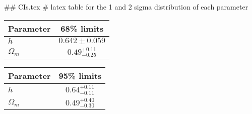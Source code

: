 ## CIs.tex
# latex table for the 1 and 2 sigma distribution of each parameter

\begin{tabular} { l  c}
 Parameter &  68\% limits\\
\hline
{\boldmath$h              $} & $0.642\pm 0.059            $\\
{\boldmath$\Omega_m       $} & $0.49^{+0.11}_{-0.25}      $\\
\hline
\end{tabular}

\begin{tabular} { l  c}
 Parameter &  95\% limits\\
\hline
{\boldmath$h              $} & $0.64^{+0.11}_{-0.11}      $\\
{\boldmath$\Omega_m       $} & $0.49^{+0.40}_{-0.30}      $\\
\hline
\end{tabular}
